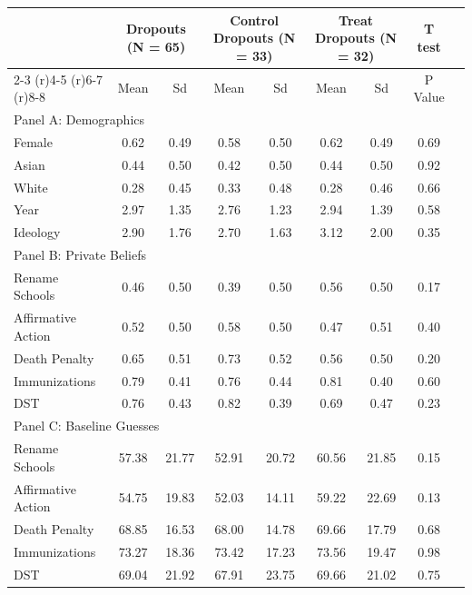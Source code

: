 \begin{tabular}{l*{8}c}\toprule & \multicolumn{2}{c}{\textbf{Dropouts (N = 65)}} & \multicolumn{2}{c}{\textbf{Control Dropouts (N = 33)}}  & \multicolumn{2}{c}{\textbf{Treat Dropouts (N = 32)}} & \multicolumn{1}{c}{\textbf{T test}} \\\cmidrule(r){2-3} \cmidrule(r){4-5} \cmidrule(r){6-7}  \cmidrule(r){8-8}  & Mean & Sd & Mean & Sd & Mean & Sd & P Value \\ \midrule \multicolumn{7}{l}{Panel A: Demographics} \\\midrule Female&    0.62&    0.49&    0.58&    0.50&    0.62&    0.49&    0.69\\Asian&    0.44&    0.50&    0.42&    0.50&    0.44&    0.50&    0.92\\White&    0.28&    0.45&    0.33&    0.48&    0.28&    0.46&    0.66\\Year&    2.97&    1.35&    2.76&    1.23&    2.94&    1.39&    0.58\\Ideology&    2.90&    1.76&    2.70&    1.63&    3.12&    2.00&    0.35\\\midrule \multicolumn{7}{l}{Panel B: Private Beliefs} \\\midrule Rename Schools&    0.46&    0.50&    0.39&    0.50&    0.56&    0.50&    0.17\\Affirmative Action&    0.52&    0.50&    0.58&    0.50&    0.47&    0.51&    0.40\\Death Penalty&    0.65&    0.51&    0.73&    0.52&    0.56&    0.50&    0.20\\Immunizations&    0.79&    0.41&    0.76&    0.44&    0.81&    0.40&    0.60\\DST&    0.76&    0.43&    0.82&    0.39&    0.69&    0.47&    0.23\\\midrule \multicolumn{7}{l}{Panel C: Baseline Guesses} \\\midrule Rename Schools&   57.38&   21.77&   52.91&   20.72&   60.56&   21.85&    0.15\\Affirmative Action&   54.75&   19.83&   52.03&   14.11&   59.22&   22.69&    0.13\\Death Penalty&   68.85&   16.53&   68.00&   14.78&   69.66&   17.79&    0.68\\Immunizations&   73.27&   18.36&   73.42&   17.23&   73.56&   19.47&    0.98\\DST&   69.04&   21.92&   67.91&   23.75&   69.66&   21.02&    0.75\\\bottomrule \end{tabular} 